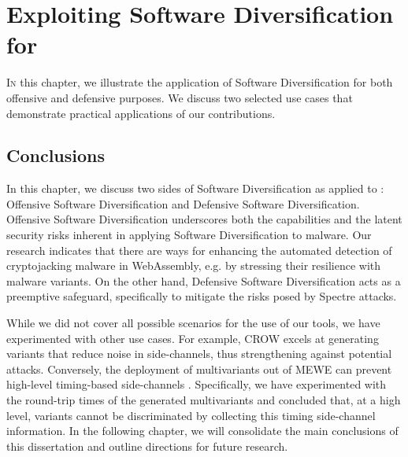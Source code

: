 \chapter{Exploiting Software Diversification for \Wasm}
\label{exploit}




\vspace{12mm}

\lettrine[lines=3]{I}{n} this chapter, we illustrate the application of Software Diversification for both offensive and defensive purposes.
We discuss two selected use cases that demonstrate practical applications of our contributions.








% 

\section*{Conclusions}

In this chapter, we discuss two sides of Software Diversification as applied to \Wasm: Offensive Software Diversification and Defensive Software Diversification.
Offensive Software Diversification underscores both the capabilities and the latent security risks inherent in applying Software Diversification to \Wasm malware.
Our research indicates that there are ways for enhancing the automated detection of cryptojacking malware in WebAssembly, e.g. by stressing their resilience with \Wasm malware variants.
On the other hand, Defensive Software Diversification acts as a preemptive safeguard, specifically to mitigate the risks posed by Spectre attacks.

While we did not cover all possible scenarios for the use of our tools, we have experimented with other use cases. 
For example, CROW excels at generating \Wasm variants that reduce noise in side-channels, thus strengthening against potential attacks. 
Conversely, the deployment of multivariants out of MEWE can prevent high-level timing-based side-channels \cite{morgan2015web}. 
Specifically, we have experimented with the round-trip times of the generated multivariants and concluded that, at a high level, variants cannot be discriminated by collecting this timing side-channel information. 
In the following chapter, we will consolidate the main conclusions of this dissertation and outline directions for future research.
